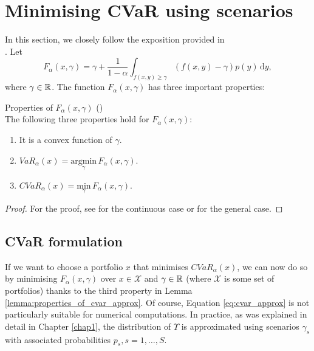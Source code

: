 \section{Minimising CVaR using scenarios}
In this section, we closely follow the exposition provided in \\ \cite[p. 275-278]{cornuejols_tutuncu_2006}.
Let
\begin{equation}
\label{eq:cvar_approx}
F_{\alpha}(x,\gamma)=\gamma + \frac{1}{1-\alpha} \int_{f(x,y) \geq \gamma} (f(x,y)-\gamma)p(y) \, \mathrm{d}y,
\end{equation}
where $\gamma \in \mathbb{R}$.
The function $F_{\alpha}(x,\gamma)$ has three important properties:
\begin{lemma}{\normalfont Properties of $F_{\alpha}(x,\gamma)$} {\normalfont (\cite[p. 276]{cornuejols_tutuncu_2006})}
\label{lemma:properties_of_cvar_approx} 
\\
The following three properties hold for $F_{\alpha}(x,\gamma)$:
\begin{enumerate}
	\item It is a convex function of $\gamma$.
	\item $VaR_{\alpha}(x)=\underset{\gamma}{\mathrm{argmin}} \, F_{\alpha}(x,\gamma)$.
	\item $ CVaR_{\alpha}(x) = \underset{\gamma}{\mathrm{min}} \, F_{\alpha}(x,\gamma)$.
\end{enumerate}
\end{lemma}
\begin{proof}
For the proof, see \cite[Theorems 1 and 2]{Rockafellar2000OptimizationOC} for the continuous case or \cite[Theorems 10, 14 and Corrolary 11]{cvar_general_loss_distributions} for the general case.
\end{proof}
\subsection{CVaR formulation}
If we want to choose a portfolio $x$ that minimises $CVaR_{\alpha}(x)$, we can now do so by minimising $F_{\alpha}(x,\gamma)$ over $x \in \mathcal{X}$ and $\gamma \in \mathbb{R}$ (where $\mathcal{X}$ is some set of portfolios) thanks to the third property in Lemma \ref{lemma:properties_of_cvar_approx}. Of course, Equation \ref{eq:cvar_approx} is not particularly suitable for numerical computations. In practice, as was explained in detail in Chapter \ref{chap1}, the distribution of $\Upsilon$ is approximated using scenarios $\gamma_s$ with associated probabilities $p_s, s=1,\dots,S$.

